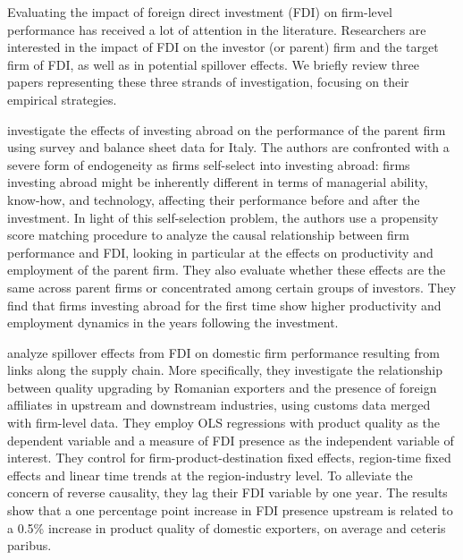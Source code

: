 Evaluating the impact of foreign direct investment (FDI) on firm-level performance has received a lot of attention in the literature. Researchers are interested in the impact of FDI on the investor (or parent) firm and the target firm of FDI, as well as in potential spillover effects. We briefly review three papers representing these three strands of investigation, focusing on their empirical strategies. \\ \par

\cite{borin2016foreign} investigate the effects of investing abroad on the performance of the parent firm using survey and balance sheet data for Italy. The authors are confronted with a severe form of endogeneity as firms self-select into investing abroad: firms investing abroad might be inherently different in terms of managerial ability, know-how, and technology, affecting their performance before and after the investment. In light of this self-selection problem, the authors use a propensity score matching procedure to analyze the causal relationship between firm performance and FDI, looking in particular at the effects on productivity and employment of the parent firm. They also evaluate whether these effects are the same across parent firms or concentrated among certain groups of investors. They find that firms investing abroad for the first time show higher productivity and employment dynamics in the years following the investment. \\ \par

\cite{bajgar2020climbing} analyze spillover effects from FDI on domestic firm performance resulting from links along the supply chain. More specifically, they investigate the relationship between quality upgrading by Romanian exporters and the presence of foreign affiliates in upstream and downstream industries, using customs data merged with firm-level data. They employ OLS regressions with product quality as the dependent variable and a measure of FDI presence as the independent variable of interest. They control for firm-product-destination fixed effects, region-time fixed effects and linear time trends at the region-industry level. To alleviate the concern of reverse causality, they lag their FDI variable by one year. The results show that a one percentage point increase in FDI presence upstream is related to a 0.5\% increase in product quality of domestic exporters, on average and ceteris paribus. \\ \par

